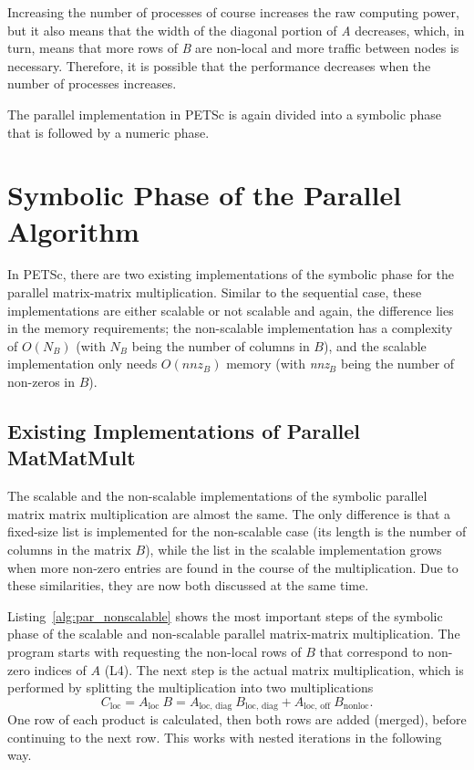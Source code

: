 Increasing the number of processes of course increases the raw computing power, but it also means that the width of the diagonal portion of \textit{A} decreases, which, in turn, means that more rows of \textit{B} are non-local and  more traffic between nodes is necessary. Therefore, it is possible that the performance decreases when the number of processes increases.

The parallel implementation in PETSc is again divided into a symbolic phase that is followed by a numeric phase. 


\section{Symbolic Phase of the Parallel Algorithm}
In PETSc, there are two existing implementations of the symbolic phase for the parallel matrix-matrix multiplication. Similar to the sequential case, these implementations are either scalable or not scalable and again, the difference lies in the memory requirements; the non-scalable implementation has a complexity of $O(N_B)$ (with $N_B$ being the number of columns in $B$), and the scalable implementation only needs $O(\textit{nnz}_B)$ memory (with \textit{nnz}$_B$ being the number of non-zeros in $B$).

\subsection{Existing Implementations of Parallel MatMatMult}
The scalable and the non-scalable implementations of the symbolic parallel matrix matrix multiplication are almost the same. The only difference is that a fixed-size list is implemented for the non-scalable case (its length is the number of columns in the matrix $B$), while the list in the scalable implementation grows when more non-zero entries are found in the course of the multiplication. Due to these similarities, they are now both discussed at the same time.


Listing~\ref{alg:par_nonscalable} shows the most important steps of the symbolic phase of the scalable and non-scalable parallel matrix-matrix multiplication. The program starts with requesting the non-local rows of $B$ that correspond to non-zero indices of $A$ (L4). The next step is the actual matrix multiplication, which is performed by splitting the multiplication into two multiplications 
\begin{equation}
C_{\textrm{loc}} = A_{\textrm{loc~}} B = A_{\textrm{loc, diag~}} B_{\textrm{loc, diag}} + A_{\textrm{loc, off~}} B_{\mathrm{nonloc}}.
\end{equation}
One row of each product is calculated, then both rows are added (merged), before continuing to the next row. This works with nested iterations in the following way. 

